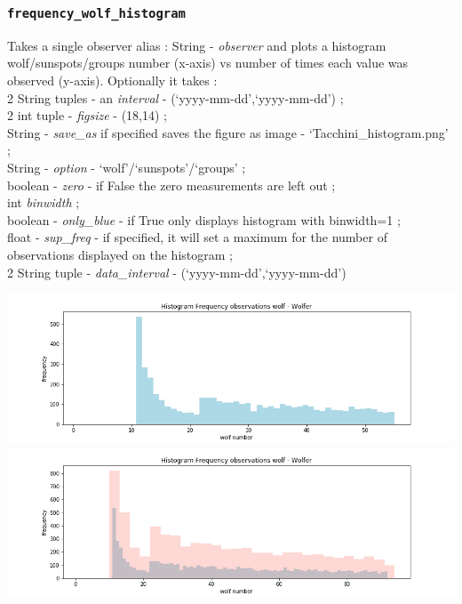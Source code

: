 \documentclass[12pt]{article}
\begin{document}
\subsubsection{\texttt{frequency\_wolf\_histogram}}
Takes a single observer alias : String - \textit{observer} and plots a histogram wolf/sunspots/groups number (x-axis) vs number of times each value was observed (y-axis). Optionally it takes : \\
2 String tuples - an \textit{interval} - (`yyyy-mm-dd',`yyyy-mm-dd') ;\\
2 int tuple - \textit{figsize} - (18,14) ; \\
String - \textit{save\_as} if specified saves the figure as image - `Tacchini\_histogram.png' ; \\
String - \textit{option} - `wolf'/`sunspots'/`groups' ; \\
boolean - \textit{zero} - if False the zero measurements are left out ; \\
int \textit{binwidth} ; \\
boolean - \textit{only\_blue} - if True only displays histogram with binwidth=1 ; \\
float - \textit{sup\_freq} - if specified, it will set a maximum for the number of observations displayed on the histogram ;\\
2 String tuple - \textit{data\_interval} - (`yyyy-mm-dd',`yyyy-mm-dd')

{\centering
\caption{}
\includegraphics[width=\linewidth]{histogram_wolfer.png}
\includegraphics[width=\linewidth]{histogram_wolfer2.png}
\label{}
\par}
\end{document}

